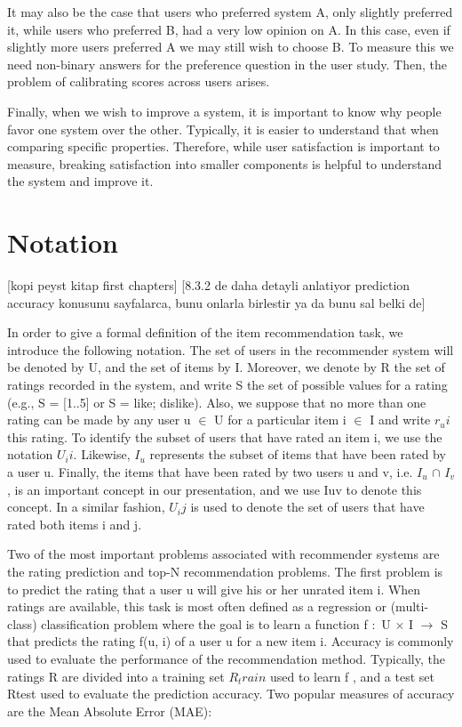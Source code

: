 It may also be the case that users who preferred system A, only slightly preferred it, while users who preferred B, had a very low opinion on A. In this case, even if slightly more users preferred A we may still wish to choose B. To measure this we need non-binary answers for the preference question in the user study. Then, the problem of calibrating scores across users arises.

Finally, when we wish to improve a system, it is important to know why people favor one system over the other. Typically, it is easier to understand that when comparing specific properties. Therefore, while user satisfaction is important to measure, breaking satisfaction into smaller components is helpful to understand the system and improve it.

\section{Notation}
[kopi peyst kitap first chapters]
[8.3.2 de daha detayli anlatiyor prediction accuracy konusunu sayfalarca, bunu onlarla birlestir ya da bunu sal belki de]

In order to give a formal definition of the item recommendation task, we introduce the following notation. The set of users in the recommender system will be denoted by U, and the set of items by I. Moreover, we denote by R the set of ratings recorded in the system, and write S the set of possible values for a rating (e.g., S = [1..5] or S = {like; dislike}). Also, we suppose that no more than one rating can be made by any user u $\in$  U for a particular item i $\in$ I and write $r_ui$ this rating. To identify the subset of users that have rated an item i, we use the notation $U_ii$. Likewise, $I_u$ represents the subset of items that have been rated by a user u. Finally, the items that have been rated by two users u and v, i.e. $I_u$ $\cap$ $I_v$, is an important concept in our presentation, and we use Iuv to denote this concept. In a similar fashion, $U_ij$ is used to denote the set of users that have rated both items i and j.

Two of the most important problems associated with recommender systems are the rating prediction and top-N recommendation problems. The first problem is to predict the rating that a user u will give his or her unrated item i. When ratings are available, this task is most often defined as a regression or (multi-class) classification problem where the goal is to learn a function f $\colon$ U $\times$ I $\rightarrow$ S that predicts the rating f(u, i) of a user u for a new item i. Accuracy is commonly used to evaluate the performance of the recommendation method. Typically, the ratings R are divided into a training set $R_train$ used to learn f , and a test set Rtest used to evaluate the prediction accuracy. Two popular measures of accuracy are the Mean Absolute Error (MAE):

